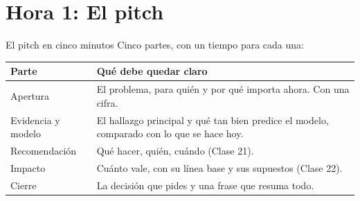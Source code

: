 \documentclass[aspectratio=169,11pt]{beamer}
\begin{document}
\section{Hora 1: El pitch}
\begin{frame}[t]{El pitch en cinco minutos}
  \small Cinco partes, con un tiempo para cada una:
  \vspace{0.15cm}
  \begin{center}
  \end{center}
  \footnotesize
  \renewcommand{\arraystretch}{1.25}
  \begin{tabular}{@{}L{2.8cm}L{10.7cm}@{}}
    \toprule
    \textbf{Parte} & \textbf{Qué debe quedar claro} \\
    \midrule
    Apertura & El problema, para quién y por qué importa ahora. Con una cifra. \\
    Evidencia y modelo & El hallazgo principal y qué tan bien predice el modelo, comparado con lo que se hace hoy. \\
    Recomendación & Qué hacer, quién, cuándo (Clase 21). \\
    Impacto & Cuánto vale, con su línea base y sus supuestos (Clase 22). \\
    Cierre & La decisión que pides y una frase que resuma todo. \\
    \bottomrule
  \end{tabular}
\end{frame}
\end{document}
